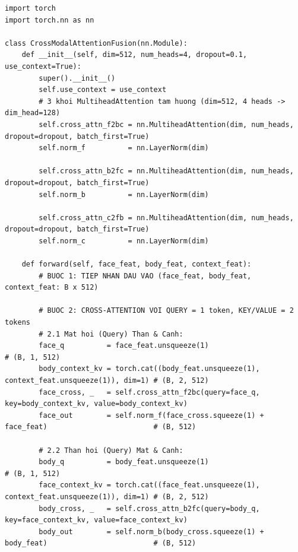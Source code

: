 \documentclass[10pt,a4paper]{article}
\begin{document}
\begin{tcolorbox}[
    enhanced,
    colback=codebg,
    colframe=codeborder,
    boxrule=1pt,
    leftrule=3.5pt,
    arc=2mm,
    title={\small\textbf{Mã nguồn PyTorch hoàn chỉnh: Cơ chế CMAF \& Luồng xử lý Forward}},
    coltitle=white,
    colbacktitle=primaryblue,
    breakable
]
\begin{lstlisting}
import torch
import torch.nn as nn

class CrossModalAttentionFusion(nn.Module):
    def __init__(self, dim=512, num_heads=4, dropout=0.1, use_context=True):
        super().__init__()
        self.use_context = use_context
        # 3 khoi MultiheadAttention tam huong (dim=512, 4 heads -> dim_head=128)
        self.cross_attn_f2bc = nn.MultiheadAttention(dim, num_heads, dropout=dropout, batch_first=True)
        self.norm_f          = nn.LayerNorm(dim)

        self.cross_attn_b2fc = nn.MultiheadAttention(dim, num_heads, dropout=dropout, batch_first=True)
        self.norm_b          = nn.LayerNorm(dim)

        self.cross_attn_c2fb = nn.MultiheadAttention(dim, num_heads, dropout=dropout, batch_first=True)
        self.norm_c          = nn.LayerNorm(dim)

    def forward(self, face_feat, body_feat, context_feat):
        # BUOC 1: TIEP NHAN DAU VAO (face_feat, body_feat, context_feat: B x 512)
        
        # BUOC 2: CROSS-ATTENTION VOI QUERY = 1 token, KEY/VALUE = 2 tokens
        # 2.1 Mat hoi (Query) Than & Canh:
        face_q          = face_feat.unsqueeze(1)                                                 # (B, 1, 512)
        body_context_kv = torch.cat((body_feat.unsqueeze(1), context_feat.unsqueeze(1)), dim=1) # (B, 2, 512)
        face_cross, _   = self.cross_attn_f2bc(query=face_q, key=body_context_kv, value=body_context_kv)
        face_out        = self.norm_f(face_cross.squeeze(1) + face_feat)                         # (B, 512)

        # 2.2 Than hoi (Query) Mat & Canh:
        body_q          = body_feat.unsqueeze(1)                                                 # (B, 1, 512)
        face_context_kv = torch.cat((face_feat.unsqueeze(1), context_feat.unsqueeze(1)), dim=1) # (B, 2, 512)
        body_cross, _   = self.cross_attn_b2fc(query=body_q, key=face_context_kv, value=face_context_kv)
        body_out        = self.norm_b(body_cross.squeeze(1) + body_feat)                         # (B, 512)


\end{lstlisting}
\end{tcolorbox}
\end{document}
